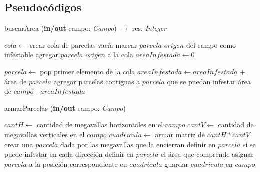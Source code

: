 \clearpage

\subsection{Pseudocódigos}

\begin{algorithm}
\caption{buscarArea (\textbf{in/out} campo: \textsl{Campo}) $\rightarrow$ res: \textsl{Integer}}
\begin{algorithmic}[1]

\STATE $cola \leftarrow$ crear cola de parcelas vacía
\STATE marcar $parcela$ $origen$ del campo como infestable
\STATE agregar $parcela$ $origen$ a la cola
\STATE $areaInfestada \leftarrow 0$

	\STATE $parcela \leftarrow$ pop primer elemento de la cola
	\STATE $areaInfestada \leftarrow areaInfestada$ $+$ área de $parcela$ 
	\STATE agregar parcelas contiguas a $parcela$ que se puedan infestar
\ENDWHILE
\RETURN área de $campo$ - $areaInfestada$
\end{algorithmic}
\end{algorithm}


\begin{algorithm}
\caption{armarParcelas (\textbf{in/out} campo: \textsl{Campo})}
\begin{algorithmic}[1]

\STATE $cantH \leftarrow$ cantidad de megavallas horizontales en el $campo$
\STATE $cantV \leftarrow$ cantidad de megavallas verticales en el $campo$
\STATE $cuadricula \leftarrow$ armar matriz de $cantH*cantV$
		\STATE crear una $parcela$ dada por las megavallas que la encierran
		\STATE definir en $parcela$ si se puede infestar en cada dirección
		\STATE definir en $parcela$ el área que comprende
		\STATE asignar $parcela$ a la posición correspondiente en $cuadricula$
	\ENDWHILE
\ENDWHILE
\STATE guardar $cuadricula$ en $campo$
\end{algorithmic}
\end{algorithm}

\clearpage

